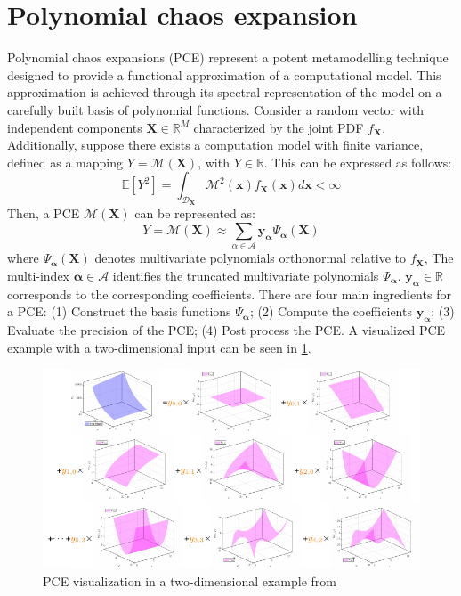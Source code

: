 \section{Polynomial chaos expansion}
Polynomial chaos expansions (PCE) represent a potent metamodelling technique designed to provide a functional approximation of a computational model. This approximation is achieved through its spectral representation of the model on a carefully built basis of polynomial functions. Consider a random vector with independent components $\boldsymbol{X} \in \mathbb{R}^{M}$ characterized by the joint \acrshort{PDF} $f_{\boldsymbol{X}}$. Additionally, suppose there exists a computation model with finite variance, defined as a mapping $Y = \mathcal{M}(\boldsymbol{X})$, with $Y \in \mathbb{R}$. This can be expressed as follows:
\begin{equation}
    \mathbb{E}[Y^2] 
    =\int_{\mathcal{D}_{\boldsymbol{X}}}
    \mathcal{M}^2(\boldsymbol{x})f_{\boldsymbol{X}}(\boldsymbol{x})
    d\boldsymbol{x}< \infty 
\end{equation}
Then, a \acrshort{PCE} $\mathcal{M}(\boldsymbol{X})$ can be represented as:
\begin{equation}
\label{eq: PCE_basis}
Y=\mathcal{M}(\boldsymbol{X}) \approx
\sum\limits_{\alpha \in \mathcal{A} }{\boldsymbol{y_{\alpha}} \Psi_{\boldsymbol{\alpha}}(\boldsymbol{X})}
\end{equation}
where $\Psi_{\boldsymbol{\alpha}}(\boldsymbol{X})$ denotes multivariate polynomials orthonormal relative to $f_{\boldsymbol{X}}$, The multi-index $\boldsymbol{\alpha} \in \mathcal{A}$ identifies the truncated multivariate polynomials $\Psi_{\boldsymbol{\alpha}}$. $\boldsymbol{y_{\alpha}} \in \mathbb{R}$ corresponds to the corresponding coefficients. There are four main ingredients for a \acrshort{PCE}: (1) Construct the basis functions $\Psi_{\boldsymbol{\alpha}}$; (2) Compute the coefficients $\boldsymbol{y_{\alpha}}$; (3) Evaluate the precision of the \acrshort{PCE}; (4) Post process the \acrshort{PCE}. A visualized \acrshort{PCE} example with a two-dimensional input can be seen in \cref{fig: PCE_visual}.
\begin{figure}[htbp]
    \centering
    \includegraphics[width = 140mm]{Figures/figure-PCE_visualize.pdf}
    \caption{PCE visualization in a two-dimensional example from \protect\cite{PCE-visual}}
    \label{fig: PCE_visual}
\end{figure}



